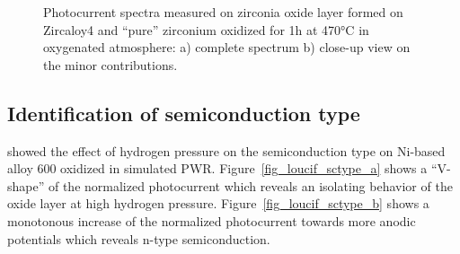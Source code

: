 \begin{figure}[h]
        \caption{Photocurrent spectra measured on zirconia oxide layer formed on 
        Zircaloy4 and “pure” zirconium oxidized for 1h at 470°C in oxygenated 
        atmosphere\citep{benaboud2007}: a) complete spectrum b) close-up view on the minor contributions.}
        \label{fig_benaboud_minor_oxides}
    \end{figure}



\subsection{Identification of semiconduction type}
    \citet{loucif2013} showed the effect of hydrogen pressure on 
    the semiconduction type on Ni-based alloy 600 oxidized in simulated PWR. 
    Figure~\ref{fig_loucif_sctype_a} shows a “V-shape” of the normalized photocurrent which 
    reveals an isolating behavior of the oxide layer at high hydrogen pressure. 
    Figure~\ref{fig_loucif_sctype_b} shows a monotonous increase of the 
    normalized photocurrent towards more anodic potentials which reveals 
    n-type semiconduction.

